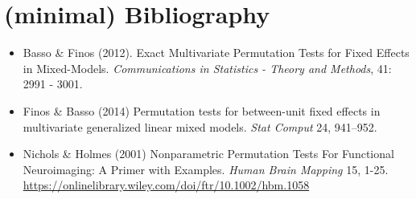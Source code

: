 \documentclass[
]{article}
\begin{document}
\hypertarget{minimal-bibliography}{%
\section{(minimal) Bibliography}\label{minimal-bibliography}}

\begin{itemize}
\item
  Basso \& Finos (2012). Exact Multivariate Permutation Tests for Fixed
  Effects in Mixed-Models. \emph{Communications in Statistics - Theory
  and Methods}, 41: 2991 - 3001.
\item
  Finos \& Basso (2014) Permutation tests for between-unit fixed effects
  in multivariate generalized linear mixed models. \emph{Stat Comput}
  24, 941--952.
\item
  Nichols \& Holmes (2001) Nonparametric Permutation Tests For
  Functional Neuroimaging: A Primer with Examples. \emph{Human Brain
  Mapping} 15, 1-25.
  \url{https://onlinelibrary.wiley.com/doi/ftr/10.1002/hbm.1058}
\end{itemize}
\end{document}
